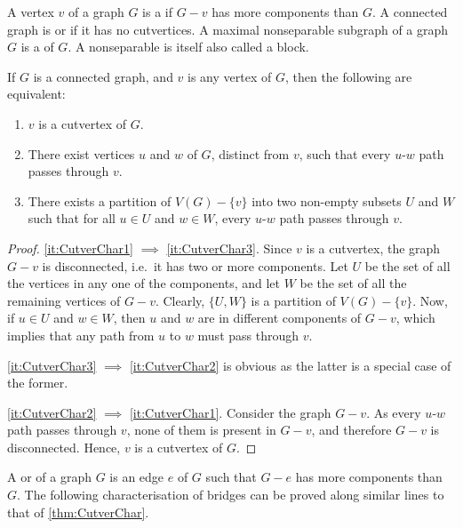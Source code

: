 A vertex $v$ of a graph $G$ is a  if $G - v$ has more components than $G$. A connected graph is  or  if it has no cutvertices. A maximal nonseparable subgraph of a graph $G$ is a  of $G$. A nonseparable is itself also called a block.

\begin{Theorem}\label{thm:CutverChar}
If $G$ is a connected graph, and $v$ is any vertex of $G$, then the following are equivalent:
\begin{enumerate}[label=(\roman*)]
\item\label{it:CutverChar1} $v$ is a cutvertex of $G$.
\item\label{it:CutverChar2} There exist vertices $u$ and $w$ of $G$, distinct from $v$, such that every $u$-$w$ path passes through $v$.
\item\label{it:CutverChar3} There exists a partition of $V(G) - \{v\}$ into two non-empty subsets $U$ and $W$ such that for all $u \in U$ and $w \in W$, every $u$-$w$ path passes through $v$.
\end{enumerate}
\end{Theorem}

\begin{proof}
\cref{it:CutverChar1} $\implies $ \cref{it:CutverChar3}. Since $v$ is a cutvertex, the graph $G - v$ is disconnected, i.e.\ it has two or more components. Let $U$ be the set of all the vertices in any one of the components, and let $W$ be the set of all the remaining vertices of $G - v$. Clearly, $\{U, W\}$ is a partition of $V(G) - \{v\}$. Now, if $u \in U$ and $w \in W$, then $u$ and $w$ are in different components of $G - v$, which implies that any path from $u$ to $w$ must pass through $v$.

\noindent \cref{it:CutverChar3} $\implies$ \cref{it:CutverChar2} is obvious as the latter is a special case of the former.

\noindent \cref{it:CutverChar2} $\implies$ \cref{it:CutverChar1}. Consider the graph $G - v$. As every $u$-$w$ path passes through $v$, none of them is present in $G - v$, and therefore $G - v$ is disconnected. Hence, $v$ is a cutvertex of $G$.
\end{proof}

A  or  of a graph $G$ is an edge $e$ of $G$ such that $G - e$ has more components than $G$. The following characterisation of bridges can be proved along similar lines to that of \cref{thm:CutverChar}.

